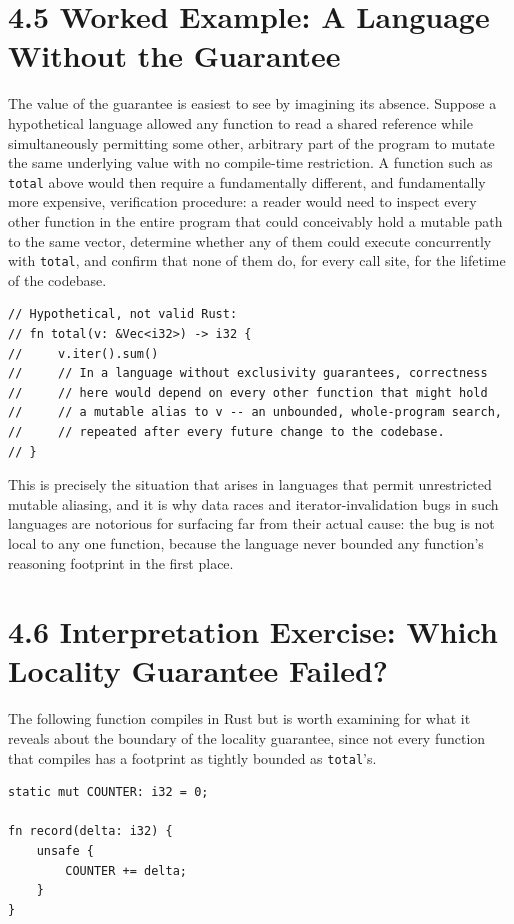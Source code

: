 \documentclass[11pt]{book}
\begin{document}
\section*{4.5 Worked Example: A Language Without the Guarantee}

The value of the guarantee is easiest to see by imagining its absence. Suppose a hypothetical language allowed any function to read a shared reference while simultaneously permitting some other, arbitrary part of the program to mutate the same underlying value with no compile-time restriction. A function such as \texttt{total} above would then require a fundamentally different, and fundamentally more expensive, verification procedure: a reader would need to inspect every other function in the entire program that could conceivably hold a mutable path to the same vector, determine whether any of them could execute concurrently with \texttt{total}, and confirm that none of them do, for every call site, for the lifetime of the codebase.

\begin{lstlisting}
// Hypothetical, not valid Rust:
// fn total(v: &Vec<i32>) -> i32 {
//     v.iter().sum()
//     // In a language without exclusivity guarantees, correctness
//     // here would depend on every other function that might hold
//     // a mutable alias to v -- an unbounded, whole-program search,
//     // repeated after every future change to the codebase.
// }
\end{lstlisting}

This is precisely the situation that arises in languages that permit unrestricted mutable aliasing, and it is why data races and iterator-invalidation bugs in such languages are notorious for surfacing far from their actual cause: the bug is not local to any one function, because the language never bounded any function's reasoning footprint in the first place.

\section*{4.6 Interpretation Exercise: Which Locality Guarantee Failed?}

The following function compiles in Rust but is worth examining for what it reveals about the boundary of the locality guarantee, since not every function that compiles has a footprint as tightly bounded as \texttt{total}'s.

\begin{lstlisting}
static mut COUNTER: i32 = 0;

fn record(delta: i32) {
    unsafe {
        COUNTER += delta;
    }
}
\end{lstlisting}
\end{document}

